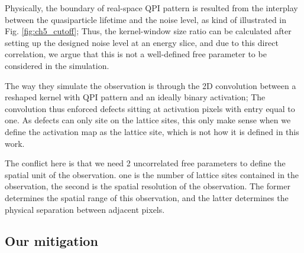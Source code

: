 Physically, the boundary of real-space QPI pattern is resulted from the interplay between the quasiparticle lifetime and the noise level, as kind of illustrated in Fig. \ref{fig:ch5_cutoff}; Thus, the kernel-window size ratio can be calculated after setting up the designed noise level at an energy slice, and due to this direct correlation, we argue that this is not a well-defined free parameter to be considered in the simulation. 

The way they simulate the observation is through the 2D convolution between a reshaped kernel with QPI pattern and an ideally binary activation; The convolution thus enforced defects sitting at activation pixels with entry equal to one. As defects can only site on the lattice sites, this only make sense when we define the activation map as the lattice site, which is not how it is defined in this work. 

The conflict here is that we need 2 uncorrelated free parameters to define the spatial unit of the observation. one is the number of lattice sites contained in the observation, the second is the spatial resolution of the observation. The former determines the spatial range of this observation, and the latter determines the physical separation between adjacent pixels. 
 
 
\subsection{Our mitigation}

